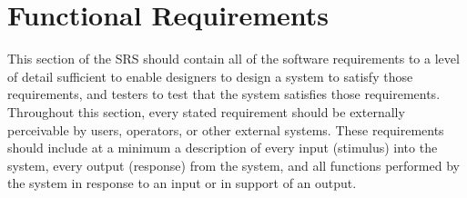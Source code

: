 \documentclass[]{article}
\begin{document}

\section{Functional Requirements}
\label{sec:functional_requirements}
This section of the SRS should contain all of the software requirements to a level of detail sufficient to enable designers to design a system to satisfy those requirements, and testers to test that the system satisfies those requirements. Throughout this section, every stated requirement should be externally perceivable by users, operators, or other external systems. These requirements should include at a minimum a description of every input (stimulus) into the system, every output (response) from the system, and all functions performed by the system in response to an input or in support of an output.
\end{document}
